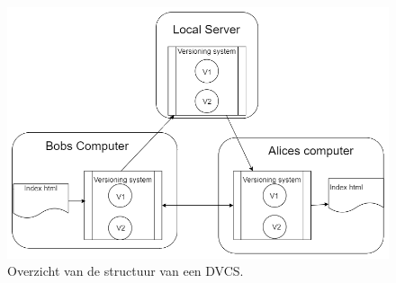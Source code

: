 \begin{itemize}
\begin{figure}[h!]
	\centering
	\caption[Overzicht structuur DVCS]{Overzicht van de structuur van een DVCS.}
	\label{fig:lvcs}
	\includegraphics[scale=0.5]{DVCS.png}
\end{figure}

\end{itemize}




